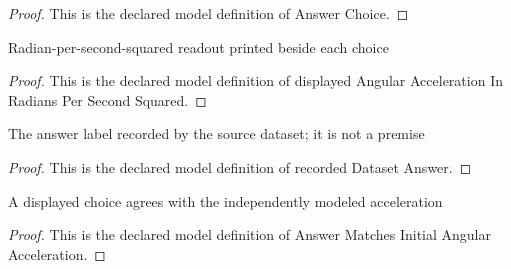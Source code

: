 \begin{proof}
  This is the declared model definition of Answer Choice.
\end{proof}
\begin{definition}
  \label{def:physics:phyx-mini-0910:phyxminiproblems-problemphyxmini0910-displayedangularaccelerationinradianspersecondsquared}
  Radian-per-second-squared readout printed beside each choice
\end{definition}
\begin{proof}
  This is the declared model definition of displayed Angular Acceleration In Radians Per Second Squared.
\end{proof}
\begin{definition}
  \label{def:physics:phyx-mini-0910:phyxminiproblems-problemphyxmini0910-recordeddatasetanswer}
  The answer label recorded by the source dataset; it is not a premise
\end{definition}
\begin{proof}
  This is the declared model definition of recorded Dataset Answer.
\end{proof}
\begin{definition}
  \label{def:physics:phyx-mini-0910:phyxminiproblems-problemphyxmini0910-answermatchesinitialangularacceleration}
  A displayed choice agrees with the independently modeled acceleration
\end{definition}
\begin{proof}
  This is the declared model definition of Answer Matches Initial Angular Acceleration.
\end{proof}
